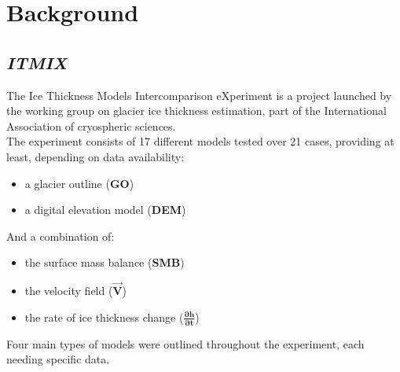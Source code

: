 \documentclass[a4, 12pt]{article}
\begin{document}
\section{Background}
\subsection{\textit{ITMIX}}
The Ice Thickness Models Intercomparison eXperiment \cite{farinotti2016accurate} is a project launched by the working group on glacier ice thickness estimation, part of the International Association of cryospheric sciences.\\
The experiment consists of 17 different models tested over 21 cases, providing at least, depending on data availability:
\begin{itemize}
\item a glacier outline (\textbf{GO}) 
\item a digital elevation model (\textbf{DEM})
\end{itemize}
And a combination of:
\begin{itemize}
\item the surface mass balance (\textbf{SMB})
\item the velocity field ($\boldsymbol{\vec{V}}$)
\item the rate of ice thickness change ($\boldsymbol{\frac{\partial h}{\partial t}}$)
\end{itemize}
Four main types of models were outlined throughout the experiment, each needing specific data.
\end{document}
